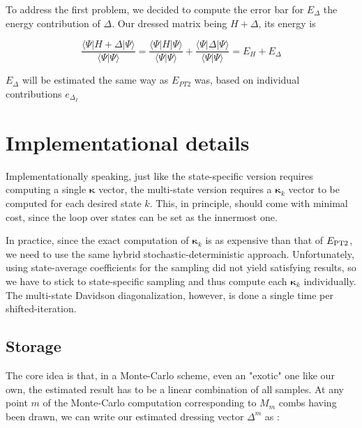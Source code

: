 \documentclass[./thesis.tex]{subfiles}
\begin{document}
To address the first problem, we decided to compute the error bar for $E_{\Delta}$ the energy contribution of $\Delta$. Our dressed matrix being $H + \Delta$, its energy is
    
\begin{equation}
\frac{\langle \Psi |H + \Delta | \Psi\rangle}{\langle \Psi | \Psi \rangle} = \frac{\langle \Psi |H  | \Psi\rangle}{\langle \Psi | \Psi \rangle} + \frac{\langle \Psi |\Delta | \Psi\rangle}{\langle \Psi | \Psi \rangle} = E_H + E_{\Delta} 
\end{equation}


$E_{\Delta}$ will be estimated the same way as $E_{PT2}$ was, based on individual contributions $e_{\Delta_I}$

\section{Implementational details}

Implementationally speaking, just like the state-specific version requires computing a single ${\pmb \kappa}$ vector, the multi-state version requires a ${\pmb \kappa}_k$ vector to be computed for each desired state $k$. This, in principle, should come with minimal cost, since the loop over states can be set as the innermost one.

\begin{algorithm}[h!]
\end{algorithm}


In practice, since the exact computation of ${\pmb \kappa}_k$ is as expensive than that of $E_\text{PT2}$, we need to use the same hybrid stochastic-deterministic approach. Unfortunately, using state-average coefficients for the sampling did not yield satisfying results, so we have to stick to state-specific sampling and thus compute each ${\pmb \kappa}_k$ individually. The multi-state Davidson diagonalization, however, is done a single time per shifted-\Bk iteration.


\subsection{Storage}

The core idea is that, in a Monte-Carlo scheme, even an "exotic" one like our own, the estimated result has to be a linear combination of all samples. At any point $m$ of the Monte-Carlo computation corresponding to $M_m$ combs having been drawn, we can write our estimated dressing vector $\Delta^m$ as :
\end{document}
